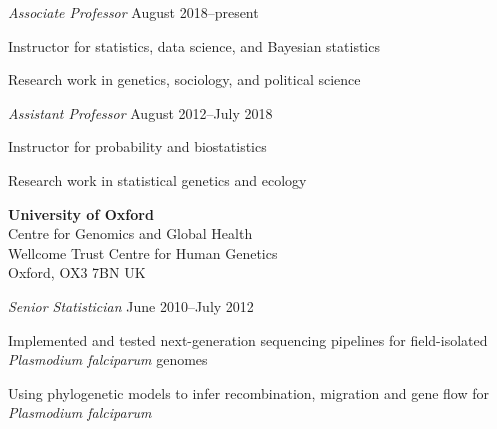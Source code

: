 \documentclass[10pt]{article}
\newenvironment{outerlist}[1][\enskip\textbullet]%
        {\begin{itemize}[#1]}{\end{itemize}%
         \vspace{-.6\baselineskip}}
\newenvironment{innerlist}[1][\enskip\textbullet]%
        {\begin{compactitem}[#1]}{\end{compactitem}}
\newcommand{\blankline}{\quad\pagebreak[2]}
\begin{document}
\begin{outerlist}
\item[] \textit{Associate Professor}%
        \hfill {August 2018--present}

\begin{innerlist}
\item Instructor for statistics,  data science, and Bayesian statistics
\item Research work in genetics, sociology,  and political science
\end{innerlist}

\end{outerlist}


\begin{outerlist}
\item[] \textit{Assistant Professor}%
        \hfill {August 2012--July 2018}

\begin{innerlist}
\item Instructor for probability and biostatistics
\item Research work in statistical genetics and ecology
\end{innerlist}

\end{outerlist}
\blankline

\textbf{University of Oxford} \\
Centre for Genomics and Global Health \\
Wellcome Trust Centre for Human Genetics \\
Oxford, OX3 7BN UK

\begin{outerlist}
\item[] \textit{Senior Statistician}%
        \hfill {June 2010--July 2012}

\begin{innerlist}
\item Implemented and tested next-generation sequencing pipelines for field-isolated \emph{Plasmodium falciparum} genomes
\item Using phylogenetic models to infer recombination, migration and gene flow for \emph{Plasmodium falciparum}
\end{innerlist}

\end{outerlist}
\blankline
\end{document}
